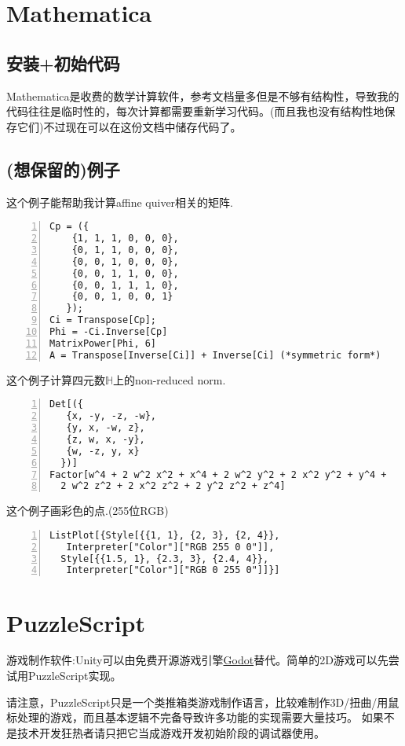 \documentclass[11pt]{amsart}
\begin{document}
\section{Mathematica}
\subsection{安装+初始代码}
Mathematica是收费的数学计算软件，参考文档量多但是不够有结构性，导致我的代码往往是临时性的，每次计算都需要重新学习代码。(而且我也没有结构性地保存它们)不过现在可以在这份文档中储存代码了。

\subsection{(想保留的)例子}

这个例子能帮助我计算affine quiver相关的矩阵.
\begin{lstlisting}[numbers=left,numberstyle=\tiny,numbersep=10pt]
Cp = ({
    {1, 1, 1, 0, 0, 0},
    {0, 1, 1, 0, 0, 0},
    {0, 0, 1, 0, 0, 0},
    {0, 0, 1, 1, 0, 0},
    {0, 0, 1, 1, 1, 0},
    {0, 0, 1, 0, 0, 1}
   });
Ci = Transpose[Cp];
Phi = -Ci.Inverse[Cp]
MatrixPower[Phi, 6]
A = Transpose[Inverse[Ci]] + Inverse[Ci] (*symmetric form*)
\end{lstlisting}
这个例子计算四元数$\mathbb{H}$上的non-reduced norm.
\begin{lstlisting}[numbers=left,numberstyle=\tiny,numbersep=10pt]
Det[({
   {x, -y, -z, -w},
   {y, x, -w, z},
   {z, w, x, -y},
   {w, -z, y, x}
  })]
Factor[w^4 + 2 w^2 x^2 + x^4 + 2 w^2 y^2 + 2 x^2 y^2 + y^4 + 
  2 w^2 z^2 + 2 x^2 z^2 + 2 y^2 z^2 + z^4]
\end{lstlisting}
这个例子画彩色的点.(255位RGB)
\begin{lstlisting}[numbers=left,numberstyle=\tiny,numbersep=10pt]
ListPlot[{Style[{{1, 1}, {2, 3}, {2, 4}}, 
   Interpreter["Color"]["RGB 255 0 0"]], 
  Style[{{1.5, 1}, {2.3, 3}, {2.4, 4}}, 
   Interpreter["Color"]["RGB 0 255 0"]]}]
\end{lstlisting}
\section{PuzzleScript}
游戏制作软件:Unity可以由免费开源游戏引擎\href{https://docs.godotengine.org/zh_CN/stable/index.html}{Godot}替代。简单的2D游戏可以先尝试用PuzzleScript实现。

请注意，PuzzleScript只是一个类推箱类游戏制作语言，比较难制作3D/扭曲/用鼠标处理的游戏，而且基本逻辑不完备导致许多功能的实现需要大量技巧。 如果不是技术开发狂热者请只把它当成游戏开发初始阶段的调试器使用。
\end{document}
